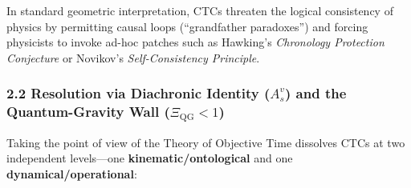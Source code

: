 \documentclass[
]{article}
\begin{document}
In standard geometric interpretation, CTCs threaten the logical
consistency of physics by permitting causal loops (``grandfather
paradoxes'') and forcing physicists to invoke ad-hoc patches such as
Hawking's \emph{Chronology Protection Conjecture} or Novikov's
\emph{Self-Consistency Principle}.

\subsubsection{\texorpdfstring{2.2 Resolution via Diachronic Identity
(\(A_s^v\)) and the Quantum-Gravity Wall
(\(\Xi_{\mathrm{QG}} < 1\))}{2.2 Resolution via Diachronic Identity (A\_s\^{}v) and the Quantum-Gravity Wall (\textbackslash Xi\_\{\textbackslash mathrm\{QG\}\} \textless{} 1)}}\label{resolution-via-diachronic-identity-a_sv-and-the-quantum-gravity-wall-xi_mathrmqg-1}

Taking the point of view of the Theory of Objective Time dissolves CTCs
at two independent levels---one \textbf{kinematic/ontological} and one
\textbf{dynamical/operational}:
\end{document}
